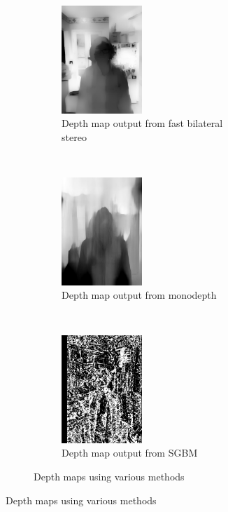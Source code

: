 \documentclass[10pt,twocolumn,letterpaper]{article}
\begin{document}
\begin{figure}[t!]
    \begin{subfigure}[t!]{\textwidth}
    \centering
    \begin{subfigure}[t!]{0.33\textwidth}
        \centering
        \includegraphics[width=1.2in]{bin/depth_map_FBIL.jpg}
        \caption{Depth map output from fast bilateral stereo}
    \end{subfigure}%
    ~
    \begin{subfigure}[t!]{0.33\textwidth}
        \centering
        \includegraphics[width=1.2in]{bin/depth_map_monodepth.jpg}
        \caption{Depth map output from monodepth}
    \end{subfigure}%
    ~
    \begin{subfigure}[t!]{0.33\textwidth}
        \centering
        \includegraphics[width=1.2in]{bin/depth_map2_SGBM.jpg}
        \caption{Depth map output from SGBM}
    \end{subfigure}
    \caption*{Depth maps using various methods}
    \end{subfigure}


\end{figure}
\end{document}

